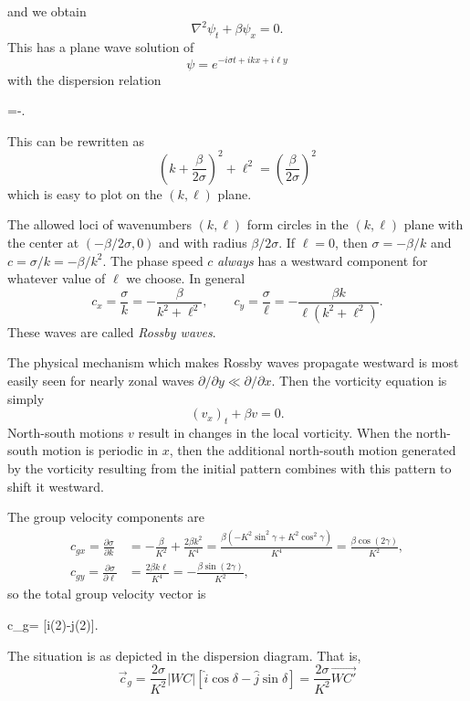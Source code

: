and we obtain
\[
	\nabla^2\psi_t+\beta\psi_x=0.
\]
This has a plane wave solution of
\[
	\psi=e^{-i\sigma t+ikx+i\ell y}
\]
with the dispersion relation
\begin{waveequation}
	\sigma=-.
\end{waveequation}
This can be rewritten as
\[
	\left(k+\frac{\beta}{2\sigma}\right)^2+\ell^2
	=\left(\frac{\beta}{2\sigma}\right)^2
\]
which is easy to plot on the $(k,\ell)$ plane.


\wavefiguremark

The allowed loci of wavenumbers $(k,\ell)$ form circles in the $(k,\ell)$ plane with
the center at $(-\beta/2\sigma,0)$ and with radius $\beta/2\sigma$. If $\ell=0$, then
$\sigma=-\beta/k$ and $c=\sigma/k=-\beta/k^2$. The phase speed $c$ \emph{always} has
a westward component for whatever value of $\ell$ we choose. In general
\[
	c_x=\frac{\sigma}{k}=-\frac{\beta}{k^2+\ell^2},
	\qquad
	c_y=\frac{\sigma}{\ell}
	=-\frac{\beta k}{\ell(k^2+\ell^2)}.
\]
These waves are called \emph{Rossby waves}.

\sourcepagebreak

The physical mechanism which makes Rossby waves propagate westward is most easily seen
for nearly zonal waves $\partial/\partial y\ll\partial/\partial x$. Then the vorticity
equation is simply
\[
	(v_x)_t+\beta v=0.
\]
North-south motions $v$ result in changes in the local vorticity. When the north-south
motion is periodic in $x$, then the additional north-south motion generated by the
vorticity resulting from the initial pattern combines with this pattern to shift it
westward.


\wavefiguremark

The group velocity components are
\begin{align*}
	c_{gx}=\frac{\partial\sigma}{\partial k}
	 & =-\frac{\beta}{K^2}+\frac{2\beta k^2}{K^4}
	=\frac{\beta(-K^2\sin^2\gamma+K^2\cos^2\gamma)}{K^4}
	=\frac{\beta\cos(2\gamma)}{K^2},              \\
	c_{gy}=\frac{\partial\sigma}{\partial\ell}
	 & =\frac{2\beta k\ell}{K^4}
	=-\frac{\beta\sin(2\gamma)}{K^2},
\end{align*}
so the total group velocity vector is
\begin{waveequation}
	\vec c_g=
	[\hat i\cos(2\gamma)-\hat j\sin(2\gamma)].
\end{waveequation}
The situation is as depicted in the dispersion diagram. That is,
\[
	\vec c_g
	=\frac{2\sigma}{K^2}|WC|[\hat i\cos\delta-\hat j\sin\delta]
	=\frac{2\sigma}{K^2}\overrightarrow{WC'}
\]

